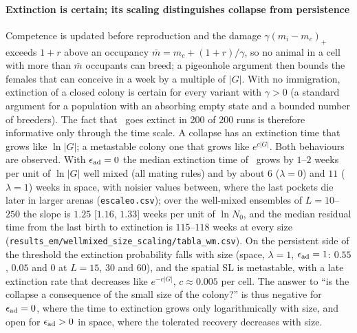 \paragraph{Extinction is certain; its scaling distinguishes collapse from persistence}
Competence is updated before reproduction and the damage $\gamma(m_i-m_c)_+$ exceeds $1+r$ above an occupancy
$\bar m=m_c+(1+r)/\gamma$, so no animal in a cell with more than $\bar m$ occupants can breed; a pigeonhole argument
then bounds the females that can conceive in a week by a multiple of $|G|$. With no immigration, extinction of a closed
colony is certain for every variant with $\gamma>0$ (a standard argument for a population with an absorbing empty
state and a bounded number of breeders). The
fact that \Cone\ goes extinct in 200 of 200 runs is therefore informative only through the time scale. A collapse
has an extinction time that grows like $\ln|G|$; a metastable colony one that grows like $e^{c|G|}$. Both behaviours
are observed. With $\epsilon_{\rm ad}=0$ the median extinction time of \Cone\ grows by $1$--$2$ weeks per unit of $\ln|G|$ well
mixed (all mating rules) and by about $6$ ($\lambda=0$) and $11$ ($\lambda=1$) weeks in space, with noisier values
between, where the last pockets die later in larger arenas (\texttt{escaleo.csv}); over the well-mixed ensembles of $L=10$--$250$ the slope is $1.25$ [$1.16$, $1.33$] weeks per
unit of $\ln N_0$, and the median residual time from the last birth to extinction is $115$--$118$ weeks at every size
(\texttt{results\_em/wellmixed\_size\_scaling/tabla\_wm.csv}). On the persistent side of the threshold the extinction probability falls with size
(space, $\lambda=1$, $\epsilon_{\rm ad}=1$: $0.55$, $0.05$ and $0$ at $L=15$, $30$ and $60$), and the spatial SL is metastable,
with a late extinction rate that decreases like $e^{-c|G|}$, $c\approx0.005$ per cell. The answer to ``is the collapse
a consequence of the small size of the colony?'' is thus negative for $\epsilon_{\rm ad}=0$, where the time to extinction grows
only logarithmically with size, and open for $\epsilon_{\rm ad}>0$ in space, where the tolerated recovery decreases with size.

